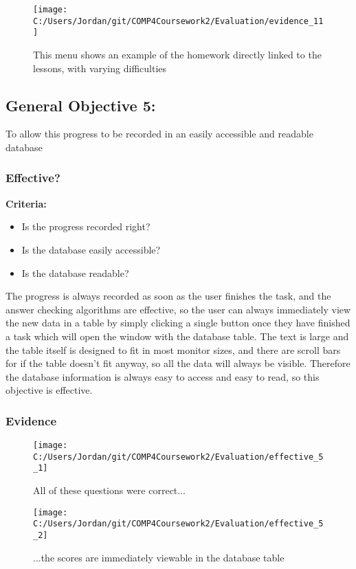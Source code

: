 \begin{figure}[H]
	\texttt{[image: C:/Users/Jordan/git/COMP4Coursework2/Evaluation/evidence\_11]}
	\caption{This menu shows an example of the homework directly linked to the lessons, with varying difficulties}
\end{figure}

\subsection{General Objective 5: }

To allow this progress to be recorded in an easily accessible and readable database

\subsubsection{Effective?}

\textbf{Criteria: }

\begin{itemize}
	\item Is the progress recorded right?
	\item Is the database easily accessible?
	\item Is the database readable?
\end{itemize}

The progress is always recorded as soon as the user finishes the task, and the answer checking algorithms are effective, so the user can always immediately view the new data in a table by simply clicking a single button once they have finished a task which will open the window with the database table. The text is large and the table itself is designed to fit in most monitor sizes, and there are scroll bars for if the table doesn't fit anyway, so all the data will always be visible. Therefore the database information is always easy to access and easy to read, so this objective is effective.

\subsubsection{Evidence}

\begin{figure}[H]
	\texttt{[image: C:/Users/Jordan/git/COMP4Coursework2/Evaluation/effective\_5\_1]}
	\caption{All of these questions were correct...}
\end{figure}

\begin{figure}[H]
	\texttt{[image: C:/Users/Jordan/git/COMP4Coursework2/Evaluation/effective\_5\_2]}
	\caption{...the scores are immediately viewable in the database table}
\end{figure}

